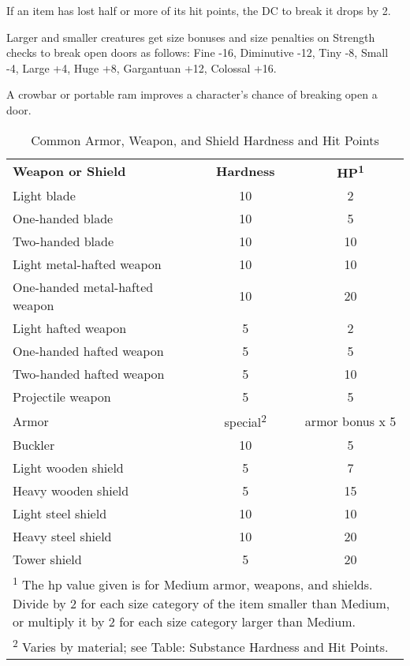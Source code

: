 If an item has lost half or more of its hit points, the DC to break it drops by 2.

Larger and smaller creatures get size bonuses and size penalties on Strength checks 
to break open doors as follows: Fine -16, Diminutive -12, Tiny -8, Small -4, Large 
+4, Huge +8, Gargantuan +12, Colossal +16.

A crowbar or portable ram improves a character's chance of breaking open a door.

\begin{table}[htb]
\caption{Common Armor, Weapon, and Shield Hardness and Hit Points}
\centering
\begin{tabular}{l c c}
\textbf{Weapon or Shield} & \textbf{Hardness} & \textbf{HP\textsuperscript{1}}\\
Light blade & 10 & 2\\
One-handed blade & 10 & 5\\
Two-handed blade & 10 & 10\\
Light metal-hafted weapon & 10 & 10\\
One-handed metal-hafted weapon & 10 & 20\\
Light hafted weapon & 5 & 2\\
One-handed hafted weapon & 5 & 5\\
Two-handed hafted weapon & 5 & 10\\
Projectile weapon & 5 & 5\\
Armor & special\textsuperscript{2} & armor bonus x 5\\
Buckler & 10 & 5\\
Light wooden shield & 5 & 7\\
Heavy wooden shield & 5 & 15\\
Light steel shield & 10 & 10\\
Heavy steel shield & 10 & 20\\
Tower shield & 5 & 20\\
\multicolumn{3}{p{10cm}}{\textsuperscript{1} The hp value given is for Medium armor, weapons, and shields. Divide by 2 for each size category of the item smaller than Medium, or multiply it by 2 for each size category larger than Medium.}\\
\multicolumn{3}{p{10cm}}{\textsuperscript{2} Varies by material; see Table: Substance Hardness and Hit Points.}\\
\end{tabular}
\end{table}

